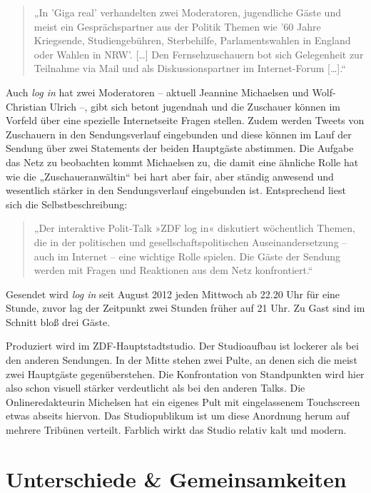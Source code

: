 \begin{quote}
	„In 'Giga real' verhandelten zwei Moderatoren, jugendliche Gäste und meist ein Gesprächspartner aus der Politik Themen wie '60 Jahre Kriegsende, Studiengebühren, Sterbehilfe, Parlamentswahlen in England oder Wahlen in NRW'. [\ldots] Den Fernsehzuschauern bot sich Gelegenheit zur Teilnahme via Mail und als Diskussionspartner im Internet-Forum [\ldots].“ \parencite[222]{kellerGeschichteTalkshowDeutschland2009}
\end{quote}

Auch \textit{log in} hat zwei Moderatoren – aktuell Jeannine Michaelsen und Wolf-Christian Ulrich –, gibt sich betont jugendnah und die Zuschauer können im Vorfeld über eine spezielle Internetseite Fragen stellen. Zudem werden Tweets von Zuschauern in den Sendungsverlauf eingebunden und diese können im Lauf der Sendung über zwei Statements der beiden Hauptgäste abstimmen. Die Aufgabe das Netz zu beobachten kommt Michaelsen zu, die damit eine ähnliche Rolle hat wie die „Zuschaueranwältin“ bei hart aber fair, aber ständig anwesend und wesentlich stärker in den Sendungsverlauf eingebunden ist. Entsprechend liest sich die Selbstbeschreibung:

\begin{quote}
	„Der interaktive Polit-Talk »ZDF log in« diskutiert wöchentlich Themen, die in der politischen und gesellschaftspolitischen Auseinandersetzung – auch im Internet – eine wichtige Rolle spielen. Die Gäste der Sendung werden mit Fragen und Reaktionen aus dem Netz konfrontiert.“ \parencite{zweitesdeutschesfernsehenZDFinfoErlauterung2012}
\end{quote}

Gesendet wird \textit{log in} seit August 2012 jeden Mittwoch ab 22.20 Uhr für eine Stunde, zuvor lag der Zeitpunkt zwei Stunden früher auf 21 Uhr. Zu Gast sind im Schnitt bloß drei Gäste.

Produziert wird im ZDF-Hauptstadtstudio. Der Studioaufbau ist lockerer als bei den anderen Sendungen. In der Mitte stehen zwei Pulte, an denen sich die meist zwei Hauptgäste gegenüberstehen. Die Konfrontation von Standpunkten wird hier also schon visuell stärker verdeutlicht als bei den anderen Talks. Die Onlineredakteurin Michelsen hat ein eigenes Pult mit eingelassenem Touchscreen etwas abseits hiervon. Das Studiopublikum ist um diese Anordnung herum auf mehrere Tribünen verteilt. Farblich wirkt das Studio relativ kalt und modern.

\section{Unterschiede \& Gemeinsamkeiten}

